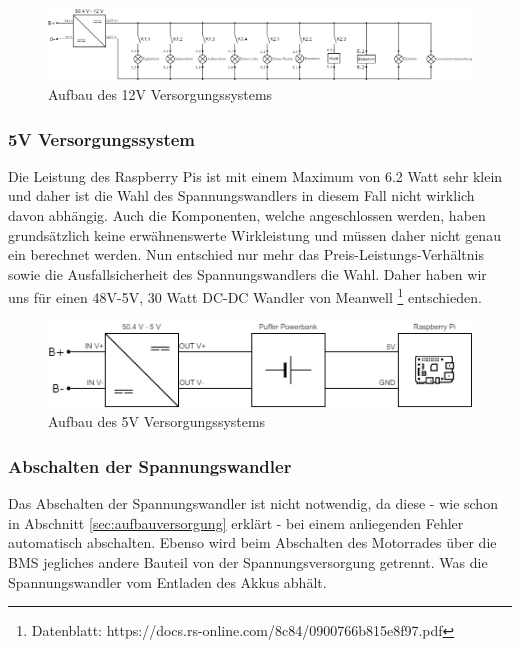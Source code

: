 \begin{figure}[H]
	\begin{center}
		\includegraphics[scale=0.4]{figures/hcis/versorgung_12V.png}
		\caption{Aufbau des 12V Versorgungssystems}
		\label{fig:12V_system}
	\end{center}
\end{figure}

\newpage

\subsubsection{5V Versorgungssystem}

Die Leistung des Raspberry Pis ist mit einem Maximum von 6.2 Watt sehr klein und daher ist die Wahl des Spannungswandlers in diesem Fall nicht wirklich davon abhängig. Auch die Komponenten, welche angeschlossen werden, haben grundsätzlich keine erwähnenswerte Wirkleistung und müssen daher nicht genau ein berechnet werden. Nun entschied nur mehr das Preis-Leistungs-Verhältnis sowie die Ausfallsicherheit des Spannungswandlers die Wahl. Daher haben wir uns für einen 48V-5V, 30 Watt DC-DC Wandler von Meanwell \footnote{Datenblatt: https://docs.rs-online.com/8c84/0900766b815e8f97.pdf} entschieden.

\begin{figure}[H]
	\begin{center}
		\includegraphics[scale=0.5]{figures/hcis/versorgung_5V.png}
		\caption{Aufbau des 5V Versorgungssystems}
		\label{fig:5V_system}
	\end{center}
\end{figure}

\subsubsection{Abschalten der Spannungswandler}

Das Abschalten der Spannungswandler ist nicht notwendig, da diese - wie schon in Abschnitt \ref{sec:aufbauversorgung} erklärt - bei einem anliegenden Fehler automatisch abschalten.
Ebenso wird beim Abschalten des Motorrades über die BMS jegliches andere Bauteil von der Spannungsversorgung getrennt. Was die Spannungswandler vom Entladen des Akkus abhält.  

